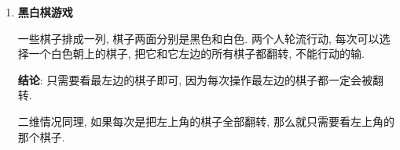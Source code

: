 \begin{enumerate}
	\item \textbf{黑白棋游戏}
	
	一些棋子排成一列, 棋子两面分别是黑色和白色. 两个人轮流行动, 每次可以选择一个白色朝上的棋子, 把它和它左边的所有棋子都翻转, 不能行动的输.

	\textbf{结论}: 只需要看最左边的棋子即可, 因为每次操作最左边的棋子都一定会被翻转.

	二维情况同理, 如果每次是把左上角的棋子全部翻转, 那么就只需要看左上角的那个棋子.

\end{enumerate}